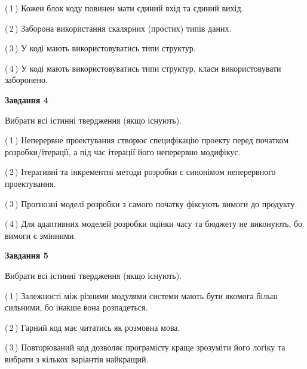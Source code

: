 \documentclass[10pt, ukrainian]{article}
\begin{document}
{\begin {large}
(\,1\,) Кожен блок коду повинен мати єдиний вхід та єдиний вихід.%



(\,2\,) Заборона використання скалярних (простих) типів даних. %



(\,3\,) У коді мають використовуватись типи структур. %



(\,4\,) У коді мають використовуватись типи структур, класи використовувати заборонено. %


{\begin {center}\textbf{Завдання 4}\end {center}}\par
Вибрати всі істинні твердження (якщо існують).\par
\vspace{2mm}



(\,1\,) Неперервне проектування створює специфікацію проекту перед початком розробки/ітерації, а під час ітерації його неперервно модифікує.%



(\,2\,) Ітеративні та інкрементні методи розробки є синонімом неперервного проектування. %



(\,3\,) Прогнозні моделі розробки з самого початку фіксують вимоги до продукту. %



(\,4\,) Для адаптивних моделей розробки оцінки часу та бюджету не виконують, бо вимоги є змінними. %


{\begin {center}\textbf{Завдання 5}\end {center}}\par
Вибрати всі істинні твердження (якщо існують).\par
\vspace{2mm}



(\,1\,) Залежності між різними модулями системи мають бути якомога більш сильними, бо інакше вона розпадеться. %



(\,2\,) Гарний код має читатись як розмовна мова. %



(\,3\,) Повторюваний код дозволяє програмісту краще зрозуміти його логіку та вибрати з кількох варіантів найкращий. %




\end{large}}
\end{document}
